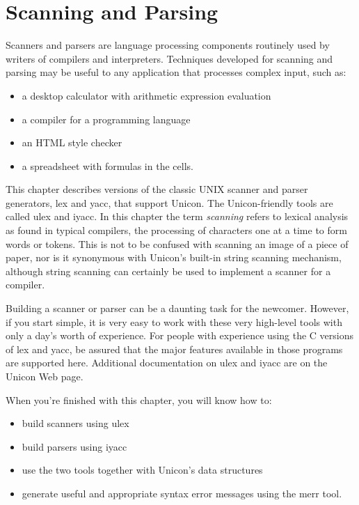 \chapter{Scanning and Parsing}

Scanners and parsers are language processing components routinely used
by writers of compilers and interpreters. Techniques developed for
scanning and parsing may be useful to any application that processes
complex input, such as:
\begin{itemize}
  \item a desktop calculator with arithmetic expression evaluation
  \item a compiler for a programming language
  \item an HTML style checker
  \item a spreadsheet with formulas in the cells.
\end{itemize}

This chapter describes versions of the classic UNIX scanner and parser
generators, \textsf{lex} and \textsf{yacc}, that
support Unicon. The Unicon-friendly tools are called \textsf{ulex} and
\textsf{iyacc}. In this chapter the term \emph{scanning} refers to lexical
analysis as found in typical compilers, the processing of characters one at
a time to form words or tokens. This is not to be confused with scanning
an image of a piece of paper, nor is it synonymous with Unicon's
built-in string scanning mechanism, although string scanning can certainly be
used to implement a scanner for a compiler.

Building a scanner or parser can be a daunting task for the
newcomer. However, if you start simple, it is very easy to work with
these very high-level tools with only a day's worth of experience. For
people with experience using the C versions of \textsf{lex} and \textsf{yacc},
be assured that the major features available in those programs are supported
here. Additional documentation on \textsf{ulex} and \textsf{iyacc} are on the
Unicon Web page.

When you're finished with this chapter, you will know
how to:
\begin{itemize}
  \item build scanners using \textsf{ulex}
  \item build parsers using \textsf{iyacc}
  \item use the two tools together with Unicon's data structures
  \item generate useful and appropriate syntax error messages using the
    \textsf{merr} tool.
\end{itemize}


